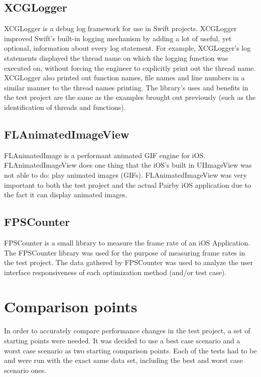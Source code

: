 \documentclass[a4paper,12pt]{article}
\begin{document}
\subsection{XCGLogger}
XCGLogger is a debug log framework for use in Swift projects.\cite{XCGLogger} XCGLogger improved Swift's built-in logging mechanism by adding a lot of useful, yet optional, information about every log statement. For example, XCGLogger's log statements displayed the thread name on which the logging function was executed on, without forcing the engineer to explicitly print out the thread name. XCGLogger also printed out function names, file names and line numbers in a similar manner to the thread names printing. The library's uses and benefits in the test project are the same as the examples brought out previously (such as the identification of threads and functions).

\subsection{FLAnimatedImageView}
FLAnimatedImage is a performant animated GIF engine for iOS.\cite{FLAnimatedImageView} FLAnimatedImageView does one thing that the iOS's built in UIImageView was not able to do: play animated images (GIFs). FLAnimatedImageView was very important to both the test project and the actual Pairby iOS application due to the fact it can display animated images.

\subsection{FPSCounter}
FPSCounter is a small library to measure the frame rate of an iOS Application.\cite{FPSCounterGithub} The FPSCounter library was used for the purpose of measuring frame rates in the test project. The data gathered by FPSCounter was used to analyze the user interface responsiveness of each optimization method (and/or test case).

\section{Comparison points}
In order to accurately compare performance changes in the test project, a set of starting points were needed. It was decided to use a best case scenario and a worst case scenario as two starting comparison points. Each of the tests had to be and were run with the exact same data set, including the best and worst case scenario ones.
\end{document}
